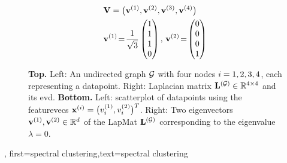 {{\begin{figure}
\begin{center}
\begin{minipage}{0.4\textwidth}
\begin{equation}
						\nonumber
					\end{equation} 
				\end{minipage}
				\vspace*{20mm}\\
				  \begin{minipage}{0.4\textwidth}
				\end{minipage} 
    		\begin{minipage}{0.4\textwidth}
										\begin{align}
											& \mathbf{V} = \big( {\bf v}^{(1)},{\bf v}^{(2)},{\bf v}^{(3)},{\bf v}^{(4)} \big) \nonumber \\
											&	\mathbf{v}^{(1)}\!=\!\frac{1}{\sqrt{3}} \begin{pmatrix} 1 \\ 1 \\ 1 \\ 0 \end{pmatrix}, \,
												\mathbf{v}^{(2)}\!=\!\begin{pmatrix} 0 \\ 0 \\ 0 \\ 1 \end{pmatrix} \nonumber 
												\end{align}
				\end{minipage} 
				\caption{\label{fig_lap_mtx_specclustering_dict} {\bf Top.} Left: An undirected \gls{graph} 
					$\mathcal{G}$ with four nodes $i=1,2,3,4$, each representing a \gls{datapoint}. Right: Laplacian matrix 
					${\bf L}^{(\mathcal{G})}  \in \mathbb{R}^{4 \times 4}$ and its \gls{evd}. 
					{\bf Bottom.} Left: \Gls{scatterplot} of \gls{datapoint}s using the \gls{featurevec}s 
					${\bf x}^{(i)} = \big( v^{(1)}_{i},v^{(2)}_{i} \big)^{T}$. 
					Right: Two \gls{eigenvector}s ${\bf v}^{(1)},{\bf v}^{(2)} \in \mathbb{R}^{d}$ 
					of the \gls{LapMat} ${\bf L}^{(\mathcal{G})}$ corresponding to the \gls{eigenvalue} $\lambda=0$. 
					} 
			\end{center}
		\end{figure}
	\newpage}, 
	first={spectral clustering},text={spectral clustering} 
}

